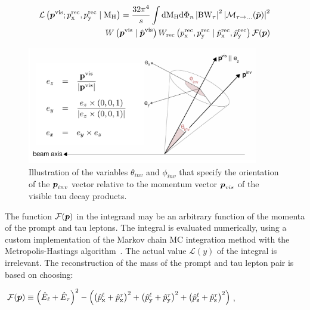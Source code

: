 \begin{equation}
  \begin{aligned}
    \mathcal{L}\left(\boldsymbol{p}^{\text{vis}} ; p_{\text{x}}^{\text{rec}}, p_{\text{y}}^{\text{rec}} \mid \text{M}_{\text{H}} \right)=\frac{32 \pi^{4}}{s} \int \text{d} \text{M}_{\text{H}} \text{d} \Phi_{n} \left|\text{BW}_{\tau}\right|^{2} \left|\mathcal{M}_{\tau \rightarrow \ldots}(\tilde{\boldsymbol{p}})\right|^{2} \\
    W\left(\boldsymbol{p}^{\text{vis}} \mid \hat{\boldsymbol{p}}^{\text{vis}}\right) W_{\text{rec}}\left(p_{\text{x}}^{\text{rec}}, p_{\text{y}}^{\text{rec}} \mid \hat{p}_{\text{x}}^{\text{rec}}, \hat{p}_{\text{y}}^{\text{rec}} \right) \mathcal{F}(\boldsymbol{p})
  \end{aligned}
\end{equation}

\begin{figure}[!htpb]
  \centering
  \includegraphics[width=0.9\textwidth]{plots/appendix/SV.png}
  \caption{Illustration of the variables $\theta_{inv}$ and $\phi_{inv}$ that specify the orientation of the $\boldsymbol{p}_{inv}$ vector relative to the momentum vector $\boldsymbol{p}_{vis}$ of the visible tau decay products.}
  \label{fig:sv}
\end{figure}

The function $\mathcal{F}(\boldsymbol{p})$ in the integrand may be an arbitrary function of the momenta of the prompt and tau leptons. The integral is evaluated numerically, using a custom implementation of the Markov chain MC integration method with the Metropolis-Hastings algorithm~\cite{Hastings:1970aa}. The actual value $\mathcal{L}(y)$ of the integral is irrelevant. The reconstruction of the mass \mlt of the prompt and tau lepton pair is based on choosing:

$\mathcal{F}(\boldsymbol{p}) \equiv \left(\hat{E}_{\ell} + \hat{E}_{\tau}\right)^{2} - \left(\left(\hat{p}_{\text{x}}^{\ell}+\hat{p}_{\text{x}}^{\tau}\right)^{2}+\left(\hat{p}_{\text{y}}^{\ell}+\hat{p}_{\text{y}}^{\tau}\right)^{2}+\left(\hat{p}_{\text{z}}^{\ell}+\hat{p}_{\text{z}}^{\tau}\right)^{2}\right)$,

